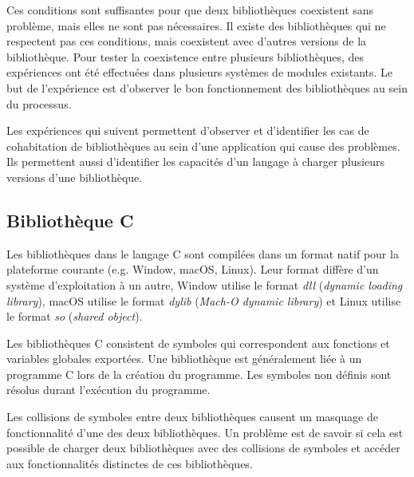 
Ces conditions sont suffisantes pour que deux bibliothèques coexistent sans
problème, mais elles ne sont pas nécessaires. Il existe des bibliothèques qui
ne respectent pas ces conditions, mais coexistent avec d'autres versions de la
bibliothèque.  Pour tester la coexistence entre plusieurs bibliothèques, des
expériences ont été effectuées dans plusieurs systèmes de modules existants. Le
but de l'expérience est d'observer le bon fonctionnement des bibliothèques au
sein du processus.

Les expériences qui suivent permettent d'observer et d'identifier les cas de
cohabitation de bibliothèques au sein d'une application qui cause des
problèmes. Ils permettent aussi d'identifier les capacités d'un langage à
charger plusieurs versions d'une bibliothèque.



\subsection{Bibliothèque C}
%
Les bibliothèques dans le langage C sont compilées dans un format natif pour la
plateforme courante (e.g. Window, macOS, Linux). Leur format diffère d'un
système d'exploitation à un autre, Window utilise le format \textit{dll}
(\textit{dynamic loading library}), macOS utilise le format \textit{dylib}
(\textit{Mach-O dynamic library}) et Linux utilise le format \textit{so}
(\textit{shared object}).

Les bibliothèques C consistent de symboles qui correspondent aux fonctions et
variables globales exportées. Une bibliothèque est généralement liée à un
programme C lors de la création du programme. Les symboles non définis sont
résolus durant l'exécution du programme.

Les collisions de symboles entre deux bibliothèques causent un masquage de
fonctionnalité d'une des deux bibliothèques. Un problème est de savoir si cela
est possible de charger deux bibliothèques avec des collisions de symboles et
accéder aux fonctionnalités distinctes de ces bibliothèques.

